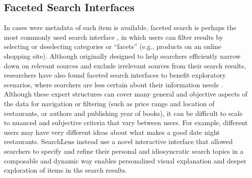 \documentclass{sigchi}
\begin{document}

\subsection{Faceted Search Interfaces}

In cases were metadata of each item is available, faceted search is perhaps the most commonly used search interface \cite{hearst2006design}, in which users can filter results by selecting or deselecting categories or ``facets'' (e.g., products on an online shopping site). Although originally designed to help searchers efficiently narrow down on relevant sources and exclude irrelevant sources from their search results, researchers have also found faceted search interfaces to benefit exploratory scenarios, where searchers are less certain about their information needs \cite{hearst2002finding,yee2003faceted}. Although these expert structures can cover many general and objective aspects of the data for navigation or filtering (such as price range and location of restaurants, or authors and publishing year of books), it can be difficult to scale to nuanced and subjective criteria that vary between users. For example, different users may have very different ideas about what makes a good date night restaurants. SearchLens instead use a novel interactive interface that allowed searchers to specify and refine their personal and idiosyncratic search topics in a composable and dynamic way enables personalized visual explanation and deeper exploration of items in the search results. 
\end{document}
